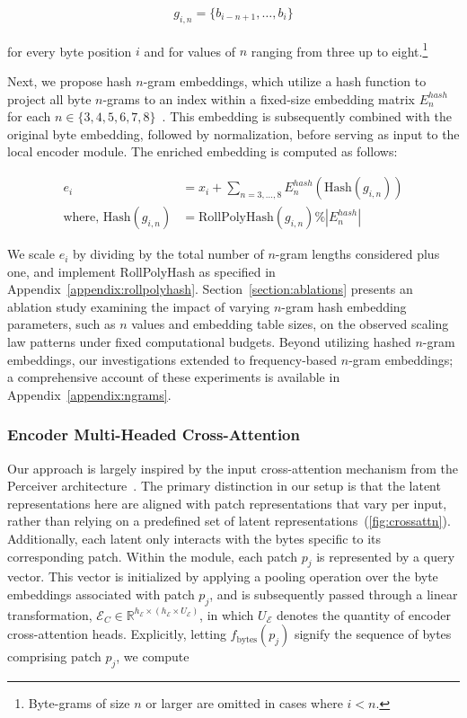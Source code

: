 \begin{align}
    g_{i,n}=\{b_{i-n + 1},\ldots, b_i\}
\end{align}

for every byte position $i$ and for values of $n$ ranging from three up to eight.\footnote{
Byte-grams of size $n$ or larger are omitted in cases where $i<n$. }

Next, we propose hash $n$-gram embeddings, which utilize a hash function to project all byte $n$-grams to an index within a fixed-size embedding matrix $E_{n}^{hash}$ for each $n \in\{3,4,5,6,7,8\}$~\citep{bai2010learning}. This embedding is subsequently combined with the original byte embedding, followed by normalization, before serving as input to the local encoder module. The enriched embedding is computed as follows:

\begin{align}
e_i &= x_i + \sum_{n = 3,...,8}E_{n}^{hash}(\text{Hash}(g_{i,n})) \\
\text{where, Hash}(g_{i,n}) &= \text{RollPolyHash}(g_{i,n}) \% |E_{n}^{hash}|
\end{align}

We scale $e_i$ by dividing by the total number of $n$-gram lengths considered plus one, and implement RollPolyHash as specified in Appendix~\ref{appendix:rollpolyhash}. Section~\ref{section:ablations} presents an ablation study examining the impact of varying $n$-gram hash embedding parameters, such as $n$ values and embedding table sizes, on the observed scaling law patterns under fixed computational budgets. Beyond utilizing hashed $n$-gram embeddings, our investigations extended to frequency-based $n$-gram embeddings; a comprehensive account of these experiments is available in Appendix~\ref{appendix:ngrams}.

\subsubsection{Encoder Multi-Headed Cross-Attention}
\label{sec:enc-cross-attn}
Our approach is largely inspired by the input cross-attention mechanism from the Perceiver architecture~\citep{jaegle2021perceiver}. The primary distinction in our setup is that the latent representations here are aligned with patch representations that vary per input, rather than relying on a predefined set of latent representations~(\autoref{fig:crossattn}). Additionally, each latent only interacts with the bytes specific to its corresponding patch. Within the module, each patch $p_j$ is represented by a query vector. This vector is initialized by applying a pooling operation over the byte embeddings associated with patch $p_j$, and is subsequently passed through a linear transformation, $\mathcal{E}_{C} \in \mathbb{R}^{h_{\mathcal{E}} \times (h_{\mathcal{E}} \times U_{\mathcal{E}})}$, in which $U_{\mathcal{E}}$ denotes the quantity of encoder cross-attention heads. Explicitly, letting $f_{\text{bytes}}(p_j)$ signify the sequence of bytes comprising patch $p_j$, we compute

